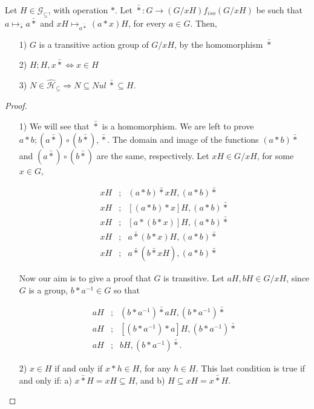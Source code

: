 \documentclass [12pt]{book}
\begin{document}
\begin{theorem}Let $H\in\mathcal{G}_{\subseteq}$, with operation $*$. Let $\bar*:G\rightarrow(G/xH)f_{iso}(G/xH)$ be such that $a\mapsto_{\bar*}a\bar*$ and $xH\mapsto_{a\bar*}(a*x)H$, for every $a\in G$. Then,\begin{itemize}\item[1)]$G$ is a transitive action group of $G/xH$, by the homomorphism $\bar*$\item[2)]$H;H,x\bar*\Leftrightarrow x\in H$\item[3)]$N\in\hat{\mathcal{H}}_\subseteq\Rightarrow N\subseteq Nul~\bar*\subseteq H$.\end{itemize}\end{theorem}

	\begin{proof}\makebox[5pt][]{}\mbox {}

		\begin{itemize}

\item[1)]We will see that $\bar*$ is a homomorphism. We are left to prove $a*b;(a\bar*)\circ(b\bar*),\bar*$. The domain and image of the functions $(a*b)\bar*$ and $(a\bar*)\circ(b\bar*)$ are the same, respectively. Let $xH\in G/xH$, for some $x\in G$,

\begin{eqnarray}\nonumber xH&;&(a*b)\bar*xH,(a*b)\bar*\\\nonumber xH&;&[(a*b)*x]H,(a*b)\bar*\\\nonumber xH&;&[a*(b*x)]H,(a*b)\bar*\\\nonumber xH&;&a\bar*(b*x)H,(a*b)\bar*\\\nonumber xH&;&a\bar*(b\bar*xH),(a*b)\bar*\end{eqnarray}

Now our aim is to give a proof that $G$ is transitive. Let $aH,bH\in G/xH$, since $G$ is a group, $b*a^{-1}\in G$ so that 

\begin{eqnarray}\nonumber aH&;&(b*a^{-1})\bar*aH,(b*a^{-1})\bar*\\\nonumber aH&;&[(b*a^{-1})*a]H,(b*a^{-1})\bar*\\\nonumber aH&;&bH,(b*a^{-1})\bar*.\end{eqnarray}

\item[2)] $x\in H$ if and only if $x*h\in H$, for any $h\in H$. This last condition is true if and only if: a) $x\bar*H=xH\subseteq H$, and b) $H\subseteq xH=x\bar*H$.


\end{itemize}
\end{proof}
\end{document}
